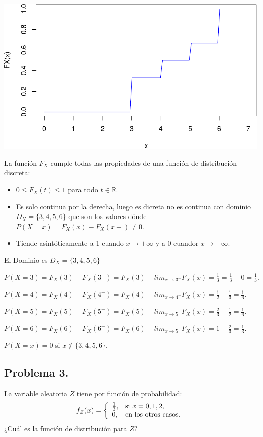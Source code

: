 \documentclass[
]{article}
\providecommand{\tightlist}{%
  \setlength{\itemsep}{0pt}\setlength{\parskip}{0pt}}
\begin{document}
\includegraphics{Tema-2---Variables-Aleatorias_Soluciones_files/figure-latex/unnamed-chunk-2-1.pdf}

La función \(F_X\) cumple todas las propiedades de una función de
distribución discreta:

\begin{itemize}
\tightlist
\item
  \(0\leq F_X(t)\leq 1\) para todo \(t\in \mathbb{R}.\)
\item
  Es solo continua por la derecha, luego es dicreta no es continua con
  dominio \(D_X=\{3,4,5,6\}\) que son los valores dónde
  \(P(X=x)=F_X(x)-F_X(x-)\not=0\).
\item
  Tiende asintóticamente a 1 cuando \(x\to+\infty\) y a 0 cuandor
  \(x\to-\infty\).
\end{itemize}

El Dominio es \(D_X=\{3,4,5,6\}\)

\(P(X=3)=F_X(3)-F_X(3^{-})=F_X(3)-lim_{x\to 3^{-}} F_X(x)=\frac{1}{3}=\frac{1}{3}-0=\frac{1}{3}.\)

\(P(X=4)=F_X(4)-F_X(4^{-})=F_X(4)-lim_{x\to 4^{-}} F_X(x)=\frac{1}{2}-\frac{1}{3}=\frac{1}{6}.\)

\(P(X=5)=F_X(5)-F_X(5^{-})=F_X(5)-lim_{x\to 5^{-}} F_X(x)=\frac{2}{3}-\frac{1}{2}=\frac{1}{6}.\)

\(P(X=6)=F_X(6)-F_X(6^{-})=F_X(6)-lim_{x\to 5^{-}} F_X(x)=1-\frac{2}{3}=\frac{1}{3}.\)

\(P(X=x)=0\) si \(x \not\in\{3,4,5,6\}.\)

\hypertarget{problema-3.}{%
\subsection{Problema 3.}\label{problema-3.}}

La variable aleatoria \(Z\) tiene por función de probabilidad:
\[f_Z (x)=
\left\{\begin{array}{ll}
{1\over 3}, & \mbox{si $x=0,1,2$},\\ 0, & \mbox{en los otros
casos.}
\end{array}\right.
\] ¿Cuál es la función de distribución para \(Z\)?
\end{document}
